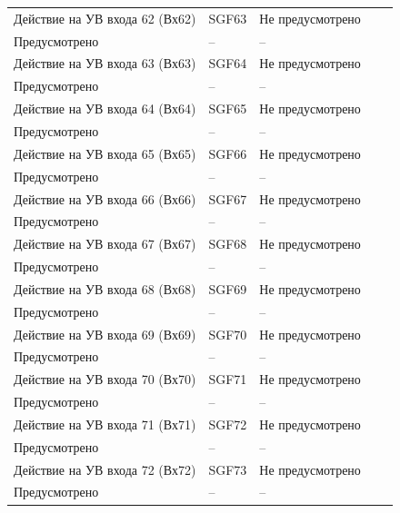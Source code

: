 \begin{longtable}{|>{\centering\arraybackslash}m{5.3cm}|>{\centering\arraybackslash}m{3.3cm}|>{\centering\arraybackslash}m{4.2cm}|>{\centering\arraybackslash}m{1.8cm}|>{\centering\arraybackslash}m{1cm}|}
\hline
\centering Действие на УВ входа 62 (Вх62)  & \centering SGF63 & \centering Не предусмотрено \\ Предусмотрено & \centering -- & \centering \arraybackslash -- \\
\hline
\centering Действие на УВ входа 63 (Вх63)  & \centering SGF64 & \centering Не предусмотрено \\ Предусмотрено & \centering -- & \centering \arraybackslash -- \\
\hline
\centering Действие на УВ входа 64 (Вх64)  & \centering SGF65 & \centering Не предусмотрено \\ Предусмотрено & \centering -- & \centering \arraybackslash -- \\
\hline
\centering Действие на УВ входа 65 (Вх65)  & \centering SGF66 & \centering Не предусмотрено \\ Предусмотрено & \centering -- & \centering \arraybackslash -- \\
\hline
\centering Действие на УВ входа 66 (Вх66)  & \centering SGF67 & \centering Не предусмотрено \\ Предусмотрено & \centering -- & \centering \arraybackslash -- \\
\hline
\centering Действие на УВ входа 67 (Вх67)  & \centering SGF68 & \centering Не предусмотрено \\ Предусмотрено & \centering -- & \centering \arraybackslash -- \\
\hline
\centering Действие на УВ входа 68 (Вх68)  & \centering SGF69 & \centering Не предусмотрено \\ Предусмотрено & \centering -- & \centering \arraybackslash -- \\
\hline
\centering Действие на УВ входа 69 (Вх69)  & \centering SGF70 & \centering Не предусмотрено \\ Предусмотрено & \centering -- & \centering \arraybackslash -- \\
\hline
\centering Действие на УВ входа 70 (Вх70)  & \centering SGF71 & \centering Не предусмотрено \\ Предусмотрено & \centering -- & \centering \arraybackslash -- \\
\hline
\centering Действие на УВ входа 71 (Вх71)  & \centering SGF72 & \centering Не предусмотрено \\ Предусмотрено & \centering -- & \centering \arraybackslash -- \\
\hline
\centering Действие на УВ входа 72 (Вх72)  & \centering SGF73 & \centering Не предусмотрено \\ Предусмотрено & \centering -- & \centering \arraybackslash -- \\

\end{longtable}
